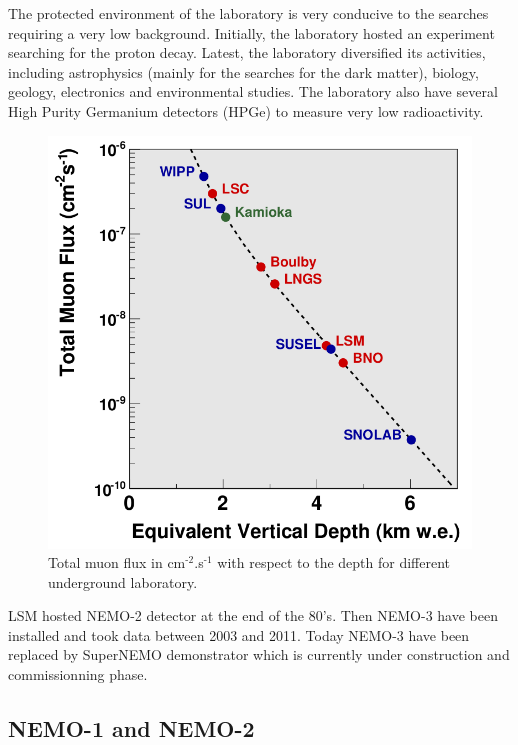 \documentclass[main.tex]{subfiles}
\begin{document}
\NI The protected environment of the laboratory is very conducive to the searches requiring a very low background. Initially, the laboratory hosted an experiment searching for the proton decay. Latest, the laboratory diversified its activities, including astrophysics (mainly for the searches for the dark matter), biology, geology, electronics and environmental studies. The laboratory also have several High Purity Germanium detectors (HPGe) to measure very low radioactivity. 


\begin{figure}[h!]
\begin{center}
\includegraphics[scale=0.27]{pictures/Chap3/lab_depth.png}
\caption{Total muon flux in cm$^{\text{-2}}$.s$^{\text{-1}}$ with respect to the depth for different underground laboratory.}
\label{LabDeepth}
\end{center}
\end{figure}


\NI LSM hosted NEMO-2 detector at the end of the 80's. Then NEMO-3 have been installed and took data between 2003 and 2011. Today NEMO-3 have been replaced by SuperNEMO demonstrator which is currently under construction and commissionning phase.


\FloatBarrier


\subsection{NEMO-1 and NEMO-2}\label{sec:NEMO1-2}
\end{document}

